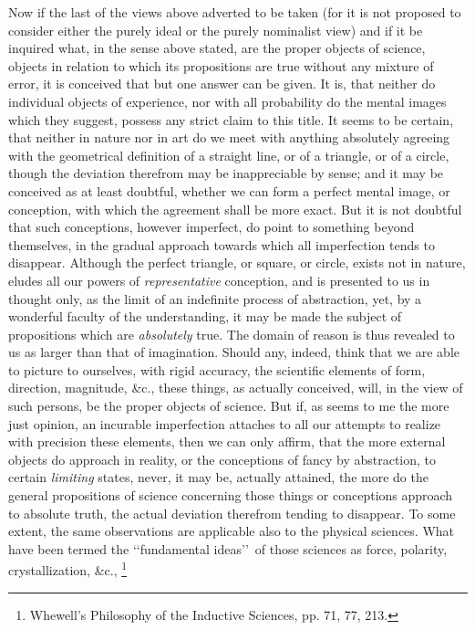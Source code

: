 \documentclass[oneside]{book}
\begin{document}
Now if the last of the views above adverted to be taken (for
it is not proposed to consider either the purely ideal or the
purely nominalist view) and if it be inquired what, in the
sense above stated, are the proper objects of science, objects in
relation to which its propositions are true without any mixture
of error, it is conceived that but one answer can be given. It
is, that neither do individual objects of experience, nor with all
probability do the mental images which they suggest, possess
any strict claim to this title. It seems to be certain, that neither
in nature nor in art do we meet with anything absolutely agreeing
with the geometrical definition of a straight line, or of a triangle,
or of a circle, though the deviation therefrom may be inappreciable by sense; and it may be conceived as at least doubtful,
whether we can form a perfect mental image, or conception, with
which the agreement shall be more exact. But it is not doubtful
that such conceptions, however imperfect, do point to something
beyond themselves, in the gradual approach towards which all
imperfection tends to disappear. Although the perfect triangle,
or square, or circle, exists not in nature, eludes all our powers of
\emph{representative} conception, and is presented to us in thought
only, as the limit of an indefinite process of abstraction, yet, by
a wonderful faculty of the understanding, it may be made the
subject of propositions which are \emph{absolutely} true. The domain of
reason is thus revealed to us as larger than that of imagination.
Should any, indeed, think that we are able to picture to ourselves,
with rigid accuracy, the scientific elements of form, direction,
magnitude, \&c., these things, as actually conceived, will, in the view
of such persons, be the proper objects of science. But if, as
seems to me the more just opinion, an incurable imperfection
attaches to all our attempts to realize with precision these elements, then we can only affirm, that the more external objects
do approach in reality, or the conceptions of fancy by abstraction,
to certain \emph{limiting} states, never, it may be, actually attained, the
more do the general propositions of science concerning those
things or conceptions approach to absolute truth, the actual deviation therefrom tending to disappear. To some extent, the same
observations are applicable also to the physical sciences. What
have been termed the \lq\lq fundamental ideas\rq\rq\ of those sciences as
force, polarity, crystallization, \&c.,%
\footnote{Whewell's Philosophy of the Inductive Sciences, pp. 71, 77, 213.
}%
\end{document}
